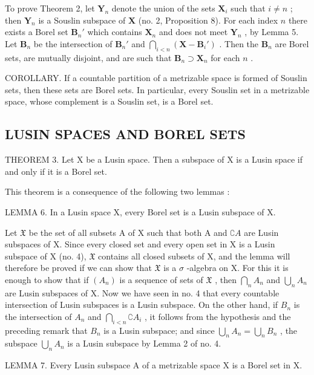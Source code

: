 To prove Theorem 2, let \(\mathbf{Y}_n\) denote the union of the sets \(\mathbf{X}_i\) such that \(i \neq n\) ; then \(\mathbf{Y}_n\) is a Souslin subspace of \(\mathbf{X}\) (no. 2, Proposition 8). For each index \(n\) there exists a Borel set \(\mathbf{B}_n'\) which contains \(\mathbf{X}_n\) and does not meet \(\mathbf{Y}_n\) , by Lemma 5. Let \(\mathbf{B}_n\) be the intersection of \(\mathbf{B}_n'\) and \(\bigcap_{i < n} (\mathbf{X} - \mathbf{B}_i')\) . Then the \(\mathbf{B}_n\) are Borel sets, are mutually disjoint, and are such that \(\mathbf{B}_n \supset \mathbf{X}_n\) for each \(n\) .

COROLLARY. If a countable partition of a metrizable space is formed of Souslin sets, then these sets are Borel sets. In particular, every Souslin set in a metrizable space, whose complement is a Souslin set, is a Borel set.

\subsection{LUSIN SPACES AND BOREL SETS}

THEOREM 3. Let X be a Lusin space. Then a subspace of X is a Lusin space if and only if it is a Borel set.

This theorem is a consequence of the following two lemmas :

LEMMA 6. In a Lusin space X, every Borel set is a Lusin subspace of X.

Let \(\mathfrak{X}\) be the set of all subsets A of X such that both A and \(\complement A\) are Lusin subspaces of X. Since every closed set and every open set in X is a Lusin subspace of X (no. 4), \(\mathfrak{X}\) contains all closed subsets of X, and the lemma will therefore be proved if we can show that \(\mathfrak{X}\) is a \(\sigma\) -algebra on X. For this it is enough to show that if \((A_n)\) is a sequence of sets of \(\mathfrak{X}\) , then \(\bigcap_{n} A_n\) and \(\bigcup_{n} A_n\) are Lusin subspaces of X. Now we have seen in no. 4 that every countable intersection of Lusin subspaces is a Lusin subspace. On the other hand, if \(B_n\) is the intersection of \(A_n\) and \(\bigcap_{i < n} \complement A_i\) , it follows from the hypothesis and the preceding remark that \(B_n\) is a Lusin subspace; and since \(\bigcup_{n} A_n = \bigcup_{n} B_n\) , the subspace \(\bigcup_{n} A_n\) is a Lusin subspace by Lemma 2 of no. 4.

LEMMA 7. Every Lusin subspace A of a metrizable space X is a Borel set in X.

